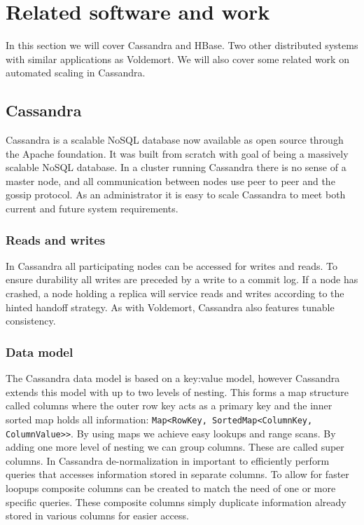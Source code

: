 \section{Related software and work}
In this section we will cover Cassandra and HBase. Two other distributed systems with similar applications as Voldemort. We will also cover some related work on automated scaling in Cassandra. 

\subsection{Cassandra}
Cassandra is a scalable NoSQL database now available as open source through the Apache foundation. It was built from scratch with goal of being a massively scalable NoSQL database. In a cluster running Cassandra there is no sense of a master node, and all communication between nodes use peer to peer and the gossip protocol. As an administrator it is easy to scale Cassandra to meet both current and future system requirements. 

\subsubsection{Reads and writes}
In Cassandra all participating nodes can be accessed for writes and reads. To ensure durability all writes are preceded by a write to a commit log. If a node has crashed, a node holding a replica will service reads and writes according to the hinted handoff strategy. As with Voldemort, Cassandra also features tunable consistency. 

\subsubsection{Data model}
The Cassandra data model is based on a key:value model, however Cassandra extends this model with up to two levels of nesting. This forms a map structure called columns where the outer row key acts as a primary key and the inner sorted map holds all information: \texttt{Map<RowKey, SortedMap<ColumnKey, ColumnValue>>}. By using maps we achieve easy lookups and range scans. By adding one more level of nesting we can group columns. These are called super columns. 
In Cassandra de-normalization in important to efficiently perform queries that accesses information stored in separate columns. To allow for faster loopups composite columns can be created to match the need of one or more specific queries. These composite columns simply duplicate information already stored in various columns for easier access. 

